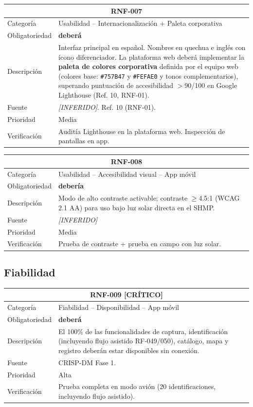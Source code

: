 \documentclass[12pt, a4paper]{article}
\newcommand{\criticomark}{\textcolor{criticolor}{\textbf{[CR\'ITICO]}}}
\newcommand{\inferido}{\textcolor{medio}{\textit{[INFERIDO]}}}
\begin{document}
\begin{longtable}{|p{3cm}|p{11.5cm}|}
\hline
\multicolumn{2}{|c|}{\textbf{RNF-007}} \\
\hline
Categor\'ia & Usabilidad -- Internacionalizaci\'on + Paleta corporativa \\
\hline
Obligatoriedad & \textbf{deber\'a} \\
\hline
Descripci\'on & Interfaz principal en espa\~nol. Nombres en quechua e ingl\'es con \'icono diferenciador. La plataforma web deber\'a implementar la \textbf{paleta de colores corporativa} definida por el equipo web (colores base: \texttt{\#757B47} y \texttt{\#FEFAE0} y tonos complementarios), superando puntuaci\'on de accesibilidad $>$90/100 en Google Lighthouse (Ref. 10, RNF-01). \\
\hline
Fuente & \inferido{}. Ref. 10 (RNF-01). \\
\hline
Prioridad & Media \\
\hline
Verificaci\'on & Audit\'ia Lighthouse en la plataforma web. Inspecci\'on de pantallas en app. \\
\hline
\end{longtable}

\begin{longtable}{|p{3cm}|p{11.5cm}|}
\hline
\multicolumn{2}{|c|}{\textbf{RNF-008}} \\
\hline
Categor\'ia & Usabilidad -- Accesibilidad visual -- App m\'ovil \\
\hline
Obligatoriedad & \textbf{deber\'ia} \\
\hline
Descripci\'on & Modo de alto contraste activable; contraste $\geq$4.5:1 (WCAG 2.1 AA) para uso bajo luz solar directa en el SHMP. \\
\hline
Fuente & \inferido{} \\
\hline
Prioridad & Media \\
\hline
Verificaci\'on & Prueba de contraste + prueba en campo con luz solar. \\
\hline
\end{longtable}

\subsection{Fiabilidad}

\begin{longtable}{|p{3cm}|p{11.5cm}|}
\hline
\multicolumn{2}{|c|}{\textbf{RNF-009} \criticomark} \\
\hline
Categor\'ia & Fiabilidad -- Disponibilidad -- App m\'ovil \\
\hline
Obligatoriedad & \textbf{deber\'a} \\
\hline
Descripci\'on & El 100\% de las funcionalidades de captura, identificaci\'on (incluyendo flujo asistido RF-049/050), cat\'alogo, mapa y registro deber\'an estar disponibles sin conexi\'on. \\
\hline
Fuente & CRISP-DM Fase 1. \\
\hline
Prioridad & Alta \\
\hline
Verificaci\'on & Prueba completa en modo avi\'on (20 identificaciones, incluyendo flujo asistido). \\
\hline
\end{longtable}
\end{document}
